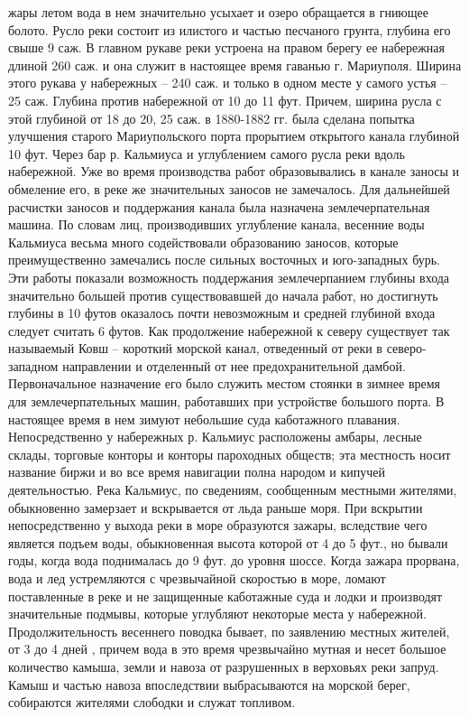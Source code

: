 жары летом вода в нем значительно усыхает и озеро обращается в гниющее болото.
Русло реки состоит из илистого и частью песчаного грунта, глубина его свыше 9
саж. В главном рукаве реки устроена на правом берегу ее набережная длиной 260
саж. и она служит в настоящее время гаванью г. Мариуполя. Ширина этого рукава у
набережных – 240 саж. и только в одном месте у самого устья – 25 саж. Глубина
против набережной от 10 до 11 фут. Причем, ширина русла с этой глубиной от 18
до 20, 25 саж. в 1880-1882 гг. была сделана попытка улучшения старого
Мариупольского порта прорытием открытого канала глубиной 10 фут. Через бар р.
Кальмиуса и углублением самого русла реки вдоль набережной. Уже во время
производства работ образовывались в канале заносы и обмеление его, в реке же
значительных заносов не замечалось. Для дальнейшей расчистки заносов и
поддержания канала была назначена землечерпательная машина. По словам лиц,
производивших углубление канала, весенние воды Кальмиуса весьма много
содействовали образованию заносов, которые преимущественно замечались после
сильных восточных и юго-западных бурь. Эти работы показали возможность
поддержания землечерпанием глубины входа значительно большей против
существовавшей до начала работ, но достигнуть глубины в 10 футов оказалось
почти невозможным и средней глубиной входа следует считать 6 футов. Как
продолжение набережной к северу существует так называемый Ковш – короткий
морской канал, отведенный от реки в северо-западном направлении и отделенный от
нее предохранительной дамбой. Первоначальное назначение его было служить местом
стоянки в зимнее время для землечерпательных машин, работавших при устройстве
большого порта. В настоящее время в нем   зимуют небольшие суда каботажного
плавания. Непосредственно у набережных р. Кальмиус расположены амбары, лесные
склады, торговые конторы и конторы пароходных обществ; эта местность носит
название биржи и во все время навигации полна народом и кипучей деятельностью.
Река Кальмиус, по сведениям, сообщенным местными жителями, обыкновенно
замерзает и вскрывается от льда раньше моря. При  вскрытии непосредственно у
выхода реки в море образуются зажары, вследствие чего является подъем воды,
обыкновенная высота которой от 4 до 5 фут., но бывали годы, когда вода
поднималась до 9 фут. до уровня шоссе. Когда зажара прорвана, вода и лед
устремляются с чрезвычайной скоростью в море, ломают поставленные в реке и не
защищенные каботажные суда и лодки и производят значительные подмывы, которые
углубляют некоторые места у набережной. Продолжительность весеннего поводка
бывает, по заявлению местных жителей, от 3 до 4 дней , причем вода в это время
чрезвычайно мутная и несет большое количество камыша, земли и навоза от
разрушенных в верховьях реки запруд. Камыш и частью навоза впоследствии
выбрасываются на морской берег, собираются жителями слободки и служат топливом.
